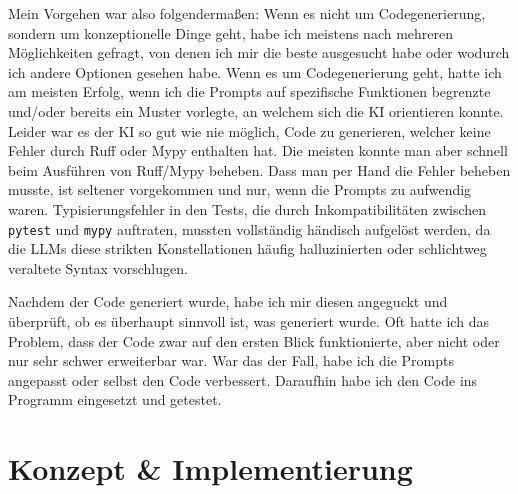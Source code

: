 \documentclass[12pt, a4paper]{article}
\begin{document}
Mein Vorgehen war also folgendermaßen:
Wenn es nicht um Codegenerierung, sondern um konzeptionelle Dinge geht, habe ich meistens nach mehreren Möglichkeiten gefragt, von denen ich mir die beste ausgesucht habe oder wodurch ich andere Optionen gesehen habe.
Wenn es um Codegenerierung geht, hatte ich am meisten Erfolg, wenn ich die Prompts auf spezifische Funktionen begrenzte und/oder bereits ein Muster vorlegte, an welchem sich die KI orientieren konnte.
Leider war es der KI so gut wie nie möglich, Code zu generieren, welcher keine Fehler durch Ruff oder Mypy enthalten hat.
Die meisten konnte man aber schnell beim Ausführen von Ruff/Mypy beheben.
Dass man per Hand die Fehler beheben musste, ist seltener vorgekommen und nur, wenn die Prompts zu aufwendig waren.
Typisierungsfehler in den Tests, die durch Inkompatibilitäten zwischen \texttt{pytest} und \texttt{mypy} auftraten, mussten vollständig händisch aufgelöst werden, da die LLMs diese strikten Konstellationen häufig halluzinierten oder schlichtweg veraltete Syntax vorschlugen.

Nachdem der Code generiert wurde, habe ich mir diesen angeguckt und überprüft, ob es überhaupt sinnvoll ist, was generiert wurde.
Oft hatte ich das Problem, dass der Code zwar auf den ersten Blick funktionierte, aber nicht oder nur sehr schwer erweiterbar war.
War das der Fall, habe ich die Prompts angepasst oder selbst den Code verbessert.
Daraufhin habe ich den Code ins Programm eingesetzt und getestet.

\section{Konzept \& Implementierung}
\end{document}
